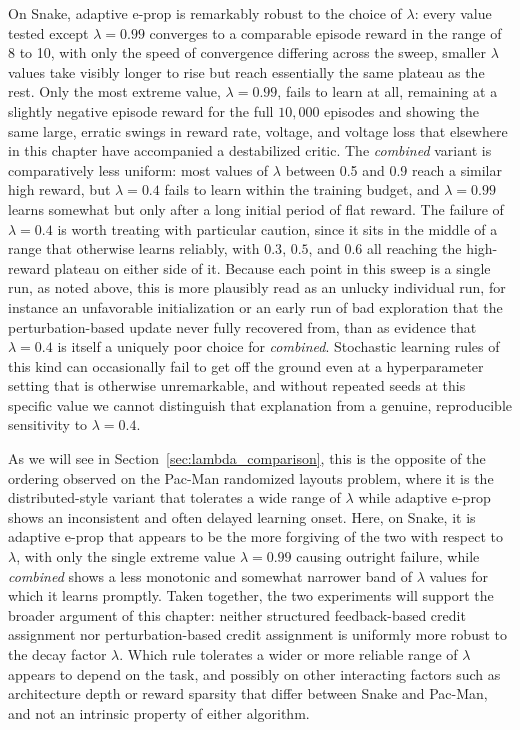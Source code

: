 On Snake, adaptive e-prop is remarkably robust to the choice of $\lambda$:
every value tested except $\lambda = 0.99$ converges to a comparable
episode reward in the range of 8 to 10, with only the speed of convergence
differing across the sweep, smaller $\lambda$ values take visibly longer to
rise but reach essentially the same plateau as the rest. Only the most
extreme value, $\lambda = 0.99$, fails to learn at all, remaining at a
slightly negative episode reward for the full $10,000$ episodes and showing
the same large, erratic swings in reward rate, voltage, and voltage loss
that elsewhere in this chapter have accompanied a destabilized critic. The
\emph{combined} variant is comparatively less uniform: most values of
$\lambda$ between 0.5 and 0.9 reach a similar high reward, but
$\lambda = 0.4$ fails to learn within the training budget, and
$\lambda = 0.99$ learns somewhat but only after a long initial period
of flat reward. The failure of $\lambda = 0.4$ is
worth treating with particular caution, since it sits in the middle of a
range that otherwise learns reliably, with $0.3$, $0.5$, and $0.6$ all
reaching the high-reward plateau on either side of it. Because each point
in this sweep is a single run, as noted
above, this is more plausibly read as an unlucky individual run, for
instance an unfavorable initialization or an early run of bad exploration
that the perturbation-based update never fully recovered from, than as
evidence that $\lambda = 0.4$ is itself a uniquely poor choice for
\emph{combined}. Stochastic learning rules of this kind can occasionally
fail to get off the ground even at a hyperparameter setting that is
otherwise unremarkable, and without repeated seeds at this specific value
we cannot distinguish that explanation from a genuine, reproducible
sensitivity to $\lambda = 0.4$.

As we will see in Section~\ref{sec:lambda_comparison}, this is the
opposite of the ordering observed on the Pac-Man randomized layouts
problem, where it is the distributed-style variant that tolerates a wide
range of $\lambda$ while adaptive e-prop shows an inconsistent and often
delayed learning onset. Here, on Snake, it is adaptive e-prop that appears
to be the more forgiving of the two with respect to $\lambda$, with only
the single extreme value $\lambda = 0.99$ causing outright failure, while
\emph{combined} shows a less monotonic and somewhat narrower band of
$\lambda$ values for which it learns promptly. Taken together, the two
experiments will support the broader argument of this chapter: 
neither structured feedback-based credit assignment nor
perturbation-based credit assignment is uniformly more robust to the
decay factor $\lambda$. Which rule tolerates a wider or more reliable
range of $\lambda$ appears to depend on the task, and possibly on other
interacting factors such as architecture depth or reward sparsity that
differ between Snake and Pac-Man, and not an intrinsic property
of either algorithm.

